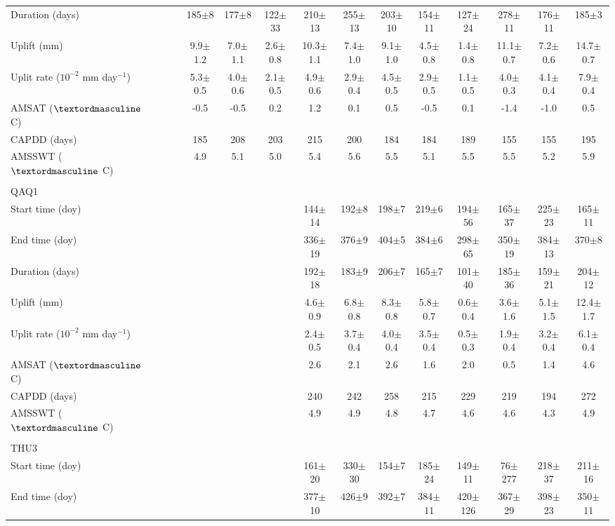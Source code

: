 \begin{table}
\begin{adjustbox}{width=1\textwidth}
\begin{threeparttable}
\begin{tabular}{lcccccccccccccc}
Duration (days)&&&&185$\pm$8&177$\pm$8&122$\pm$33&210$\pm$13&255$\pm$13&203$\pm$10&154$\pm$11&127$\pm$24&278$\pm$11&176$\pm$11&185$\pm$3\\
Uplift (mm)&&&&9.9$\pm$1.2&7.0$\pm$1.1&2.6$\pm$0.8&10.3$\pm$1.1&7.4$\pm$1.0&9.1$\pm$1.0&4.5$\pm$0.8&1.4$\pm$0.8&11.1$\pm$0.7&7.2$\pm$0.6&14.7$\pm$0.7\\
Uplit rate ($10^{-2}$ mm day$^{-1}$)&&&&5.3$\pm$0.5&4.0$\pm$0.6&2.1$\pm$0.5&4.9$\pm$0.6&2.9$\pm$0.4&4.5$\pm$0.5&2.9$\pm$0.5&1.1$\pm$0.5&4.0$\pm$0.3&4.1$\pm$0.4&7.9$\pm$0.4\\
AMSAT ($\textordmasculine$ C)&&&&-0.5&-0.5&0.2&1.2&0.1&0.5&-0.5&0.1&-1.4&-1.0&0.5\\
CAPDD (days)&&&&185&208&203&215&200&184&184&189&155&155&195\\
AMSSWT  ($\textordmasculine$ C)&&&&4.9&5.1&5.0&5.4&5.6&5.5&5.1&5.5&5.5&5.2&5.9\\
& & & & & & & & & & & & & &\\
QAQ1& & & & & & & & & & & & & &\\
Start time (doy)&&&&&&&144$\pm$14&192$\pm$8&198$\pm$7&219$\pm$6&194$\pm$56&165$\pm$37&225$\pm$23&165$\pm$11\\
End time (doy)&&&&&&&336$\pm$19&376$\pm$9&404$\pm$5&384$\pm$6&298$\pm$65&350$\pm$19&384$\pm$13&370$\pm$8\\
Duration (days)&&&&&&&192$\pm$18&183$\pm$9&206$\pm$7&165$\pm$7&101$\pm$40&185$\pm$36&159$\pm$21&204$\pm$12\\
Uplift (mm)&&&&&&&4.6$\pm$0.9&6.8$\pm$0.8&8.3$\pm$0.8&5.8$\pm$0.7&0.6$\pm$0.4&3.6$\pm$1.6&5.1$\pm$1.5&12.4$\pm$1.7\\
Uplit rate ($10^{-2}$ mm day$^{-1}$)&&&&&&&2.4$\pm$0.5&3.7$\pm$0.4&4.0$\pm$0.4&3.5$\pm$0.4&0.5$\pm$0.3&1.9$\pm$0.4&3.2$\pm$0.4&6.1$\pm$0.4\\
AMSAT ($\textordmasculine$ C)&&&&&&&2.6&2.1&2.6&1.6&2.0&0.5&1.4&4.6\\
CAPDD (days)&&&&&&&240&242&258&215&229&219&194&272\\
AMSSWT  ($\textordmasculine$ C)&&&&&&&4.9&4.9&4.8&4.7&4.6&4.6&4.3&4.9\\
& & & & & & & & & & & & & &\\
THU3& & & & & & & & & & & & & &\\
Start time (doy)&&&&&&&161$\pm$20&330$\pm$30&154$\pm$7&185$\pm$24&149$\pm$11&76$\pm$277&218$\pm$37&211$\pm$16\\
End time (doy)&&&&&&&377$\pm$10&426$\pm$9&392$\pm$7&384$\pm$11&420$\pm$126&367$\pm$29&398$\pm$23&350$\pm$11\\

\end{tabular}
\end{threeparttable}
\end{adjustbox}
\end{table}
